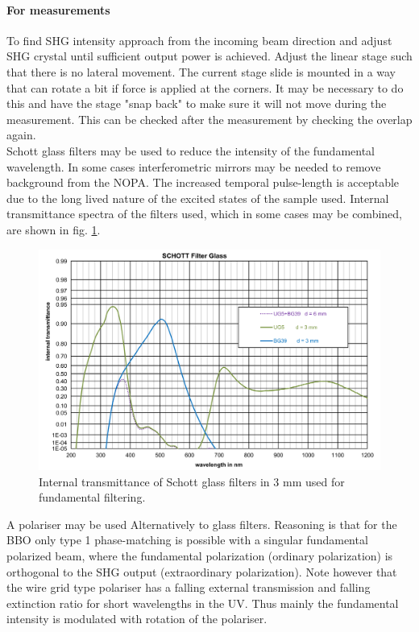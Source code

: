 \documentclass[twoside,openright]{scrreprt}
\begin{document}
\paragraph{For measurements}
To find SHG intensity approach from the incoming beam direction and adjust SHG crystal until sufficient output power is achieved.\newline
Adjust the linear stage such that there is no lateral movement. The current stage slide is mounted in a way that can rotate a bit if force is applied at the corners. It may be necessary to do this and have the stage "snap back" to make sure it will not move during the measurement. This can be checked after the measurement by checking the overlap again.\\
Schott glass filters may be used to reduce the intensity of the fundamental wavelength. In some cases interferometric mirrors may be needed to remove background from the NOPA. The increased temporal pulse-length is acceptable due to the long lived nature of the excited states of the sample used. Internal transmittance spectra of the filters used, which in some cases may be combined, are shown in fig. \ref{fig:SchottFilters}.

\begin{figure}[hbtp]
\centering
\includegraphics[scale = 1]{images/SchottFiltersFromTool.png}
\caption{Internal transmittance of Schott glass filters in 3 mm used for fundamental filtering.\label{fig:SchottFilters}}
\end{figure}

A polariser may be used Alternatively to glass filters. Reasoning is that for the BBO only type 1 phase-matching is possible with a singular fundamental polarized beam, where the fundamental polarization (ordinary polarization) is orthogonal to the SHG output (extraordinary polarization). Note however that the wire grid type polariser has a falling external transmission and falling extinction ratio for short wavelengths in the UV. Thus mainly the fundamental intensity is modulated with rotation of the polariser.
\end{document}
